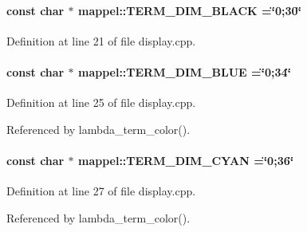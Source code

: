\paragraph[{\texorpdfstring{T\+E\+R\+M\+\_\+\+D\+I\+M\+\_\+\+B\+L\+A\+CK}{TERM_DIM_BLACK}}]{\setlength{\rightskip}{0pt plus 5cm}const char $\ast$ mappel\+::\+T\+E\+R\+M\+\_\+\+D\+I\+M\+\_\+\+B\+L\+A\+CK =\char`\"{}0;30\char`\"{}}\hypertarget{namespacemappel_a233d1d0ed4c3957ba68364c5d9f6f45e}{}\label{namespacemappel_a233d1d0ed4c3957ba68364c5d9f6f45e}


Definition at line 21 of file display.\+cpp.

\paragraph[{\texorpdfstring{T\+E\+R\+M\+\_\+\+D\+I\+M\+\_\+\+B\+L\+UE}{TERM_DIM_BLUE}}]{\setlength{\rightskip}{0pt plus 5cm}const char $\ast$ mappel\+::\+T\+E\+R\+M\+\_\+\+D\+I\+M\+\_\+\+B\+L\+UE =\char`\"{}0;34\char`\"{}}\hypertarget{namespacemappel_a81976972f9e20d3f3ec3e541302bf465}{}\label{namespacemappel_a81976972f9e20d3f3ec3e541302bf465}


Definition at line 25 of file display.\+cpp.



Referenced by lambda\+\_\+term\+\_\+color().

\paragraph[{\texorpdfstring{T\+E\+R\+M\+\_\+\+D\+I\+M\+\_\+\+C\+Y\+AN}{TERM_DIM_CYAN}}]{\setlength{\rightskip}{0pt plus 5cm}const char $\ast$ mappel\+::\+T\+E\+R\+M\+\_\+\+D\+I\+M\+\_\+\+C\+Y\+AN =\char`\"{}0;36\char`\"{}}\hypertarget{namespacemappel_ad168ab0229814251071c6680e9792b0f}{}\label{namespacemappel_ad168ab0229814251071c6680e9792b0f}


Definition at line 27 of file display.\+cpp.



Referenced by lambda\+\_\+term\+\_\+color().

